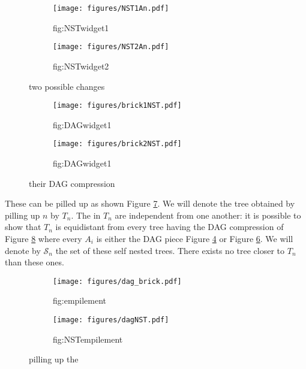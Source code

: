 \begin{figure}
 \begin{subfigure}[b]{0.45\textwidth}
    \centering
    \texttt{[image: figures/NST1An.pdf]}
    \caption{fig:NSTwidget1}
    \label{fig:NSTwidget1}
  \end{subfigure}
  \quad
  \begin{subfigure}[b]{0.45\textwidth}
    \centering
    \texttt{[image: figures/NST2An.pdf]}
    \caption{fig:NSTwidget2}
    \label{fig:NSTwidget2}
  \end{subfigure} 
  \caption{two possible changes}%
\end{figure}

\begin{figure}
 \begin{subfigure}[b]{0.45\textwidth}
    \centering
    \texttt{[image: figures/brick1NST.pdf]}
    \caption{fig:DAGwidget1}
    \label{fig:DAGwidget1}
  \end{subfigure}
  \quad
  \begin{subfigure}[b]{0.45\textwidth}
    \centering
    \texttt{[image: figures/brick2NST.pdf]}
    \caption{fig:DAGwidget1}
    \label{fig:DAGwidget2}
  \end{subfigure} 
  \caption{their DAG compression}%
\end{figure}


These \widgets can be pilled up as shown Figure
\ref{fig:empilement}. We will denote the tree obtained by pilling up
$n$ \widgets by $T_{n}$. The \widgets in $T_{n}$ are independent from
one another: it is possible to show that $T_{n}$ is
equidistant from every tree having the DAG compression of Figure
\ref{fig:NSTempilement} where every $A_{i}$ is either the DAG piece
Figure \ref{fig:DAGwidget1} or Figure \ref{fig:DAGwidget2}. We will
denote by $\mathcal{S}_{n}$ the set of these self nested trees. There
exists no tree closer to $T_{n}$ than these ones. %

\begin{figure}
 \begin{subfigure}[b]{0.45\textwidth}
    \centering
    \texttt{[image: figures/dag\_brick.pdf]}
    \caption{fig:empilement}
    \label{fig:empilement}
  \end{subfigure}
  \quad
  \begin{subfigure}[b]{0.45\textwidth}
    \centering
    \texttt{[image: figures/dagNST.pdf]}
    \caption{fig:NSTempilement}
    \label{fig:NSTempilement}
  \end{subfigure} 
  \caption{pilling up the \widgets}\label{fig:example}
\end{figure}

